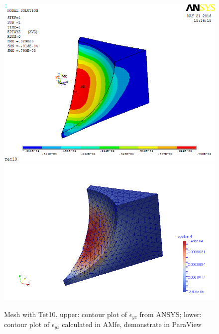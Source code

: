 \begin{figure}[htbp]
	\begin{center}
		\includegraphics[width=13cm,clip]{Tet10_Eyz.png} 		
		\includegraphics[width=13cm,clip]{Tet10_Eyz_P.png} 		
		\caption{Mesh with Tet10. upper: contour plot of $\epsilon_{yz}$ from ANSYS; lower: contour plot of $\epsilon_{yz}$ calculated in AMfe, demonstrate in ParaView} \label{fig: Tet10_Eyz}
	\end{center}
\end{figure}
\clearpage 

